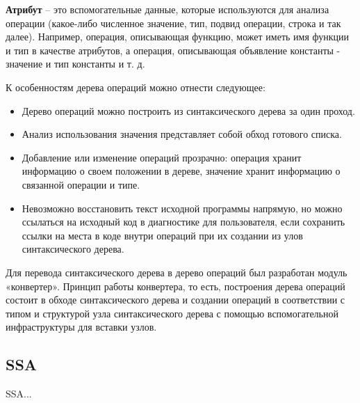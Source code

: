 \textbf{Атрибут} -- это вспомогательные данные, которые используются для анализа операции (какое-либо численное значение, тип, подвид операции, строка и так далее).
Например, операция, описывающая функцию, может иметь имя функции и тип в качестве атрибутов, а операция, описывающая объявление константы - значение и тип константы и т. д.

К особенностям дерева операций можно отнести следующее:

\begin{itemize}
    \item Дерево операций можно построить из синтаксического дерева за один проход.
    \item Анализ использования значения представляет собой обход готового списка.
    \item Добавление или изменение операций прозрачно: операция хранит информацию о своем положении в дереве, значение хранит информацию о связанной операции и типе.
    \item Невозможно восстановить текст исходной программы напрямую, но можно ссылаться на исходный код в диагностике для пользователя, если сохранить ссылки на места в коде внутри операций при их создании из улов синтаксического дерева.
\end{itemize}

Для перевода синтаксического дерева в дерево операций был разработан модуль «конвертер».
Принцип работы конвертера, то есть, построения дерева операций состоит в обходе синтаксического дерева и создании операций в соответствии с типом и структурой узла синтаксического дерева с помощью вспомогательной инфраструктуры для вставки узлов.

\subsection{SSA}

SSA...
